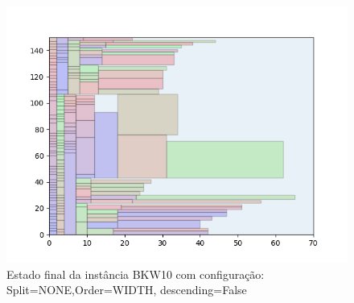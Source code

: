 \begin{figure}[H]
    \centering
    \caption[]{Estado final da instância BKW10 com configuração: Split=NONE,Order=WIDTH, descending=False}
    \label{fig:bkw10-none-width-false}
    \includegraphics[scale=0.5]{output/figures/bkw/bkw10/none/width/false/000}
\end{figure}